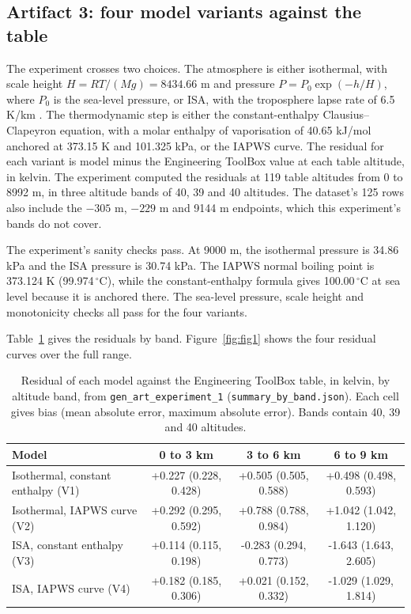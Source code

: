 \documentclass[11pt,letterpaper]{article}
\begin{document}
\subsection{Artifact 3: four model variants against the table}

The experiment crosses two choices. The atmosphere is either isothermal, with scale height $H = RT/(Mg) = 8434.66$ m and pressure $P = P_0 \exp(-h/H)$, where $P_0$ is the sea-level pressure, or ISA, with the troposphere lapse rate of 6.5 K/km \cite{ref3}. The thermodynamic step is either the constant-enthalpy Clausius--Clapeyron equation, with a molar enthalpy of vaporisation of 40.65 kJ/mol anchored at 373.15 K and 101.325 kPa, or the IAPWS curve. The residual for each variant is model minus the Engineering ToolBox value at each table altitude, in kelvin. The experiment computed the residuals at 119 table altitudes from 0 to 8992 m, in three altitude bands of 40, 39 and 40 altitudes. The dataset's 125 rows also include the $-305$ m, $-229$ m and 9144 m endpoints, which this experiment's bands do not cover.

The experiment's sanity checks pass. At 9000 m, the isothermal pressure is 34.86 kPa and the ISA pressure is 30.74 kPa. The IAPWS normal boiling point is 373.124 K (99.974\,$^\circ$C), while the constant-enthalpy formula gives 100.00\,$^\circ$C at sea level because it is anchored there. The sea-level pressure, scale height and monotonicity checks all pass for the four variants.

Table~\ref{tab:band1} gives the residuals by band. Figure~\ref{fig:fig1} shows the four residual curves over the full range.

\begin{table}[!htbp]
\centering\small
\caption{Residual of each model against the Engineering ToolBox table, in kelvin, by altitude band, from \texttt{gen\_art\_experiment\_1} (\texttt{summary\_by\_band.json}). Each cell gives bias (mean absolute error, maximum absolute error). Bands contain 40, 39 and 40 altitudes.}\label{tab:band1}
\begin{tabular}{p{4.6cm}ccc}
\toprule
Model & 0 to 3 km & 3 to 6 km & 6 to 9 km \\
\midrule
Isothermal, constant enthalpy (V1) & +0.227 (0.228, 0.428) & +0.505 (0.505, 0.588) & +0.498 (0.498, 0.593) \\
Isothermal, IAPWS curve (V2) & +0.292 (0.295, 0.592) & +0.788 (0.788, 0.984) & +1.042 (1.042, 1.120) \\
ISA, constant enthalpy (V3) & +0.114 (0.115, 0.198) & -0.283 (0.294, 0.773) & -1.643 (1.643, 2.605) \\
ISA, IAPWS curve (V4) & +0.182 (0.185, 0.306) & +0.021 (0.152, 0.332) & -1.029 (1.029, 1.814) \\
\bottomrule
\end{tabular}
\end{table}
\end{document}
